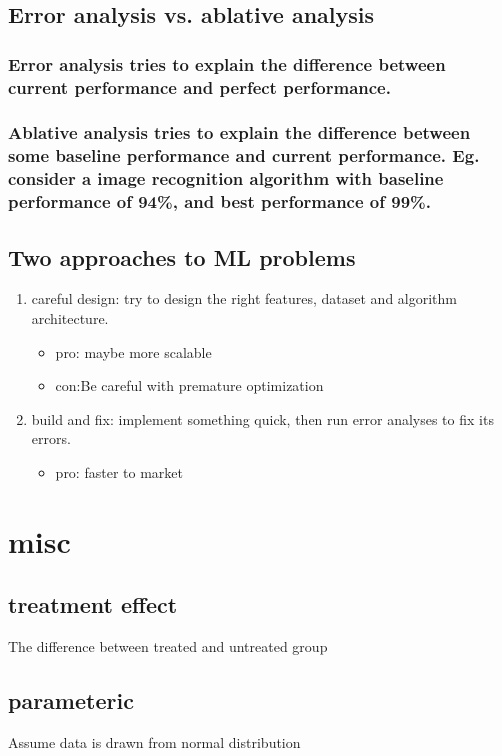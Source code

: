 \documentclass[11pt]{article}
\begin{document}
\subsection{Error analysis vs. ablative analysis}
\label{sec:org1a3acb7}
\subsubsection{Error analysis tries to explain the difference between current performance and perfect performance.}
\label{sec:orgcf1a646}
\subsubsection{Ablative analysis tries to explain the difference between some baseline performance and current performance. Eg. consider a image recognition algorithm with baseline performance of 94\%, and best performance of 99\%.}
\label{sec:org809df1a}
\subsection{Two approaches to ML problems}
\label{sec:orgd550598}
\begin{enumerate}
\item careful design: try to design the right features, dataset and algorithm architecture. 
\begin{itemize}
\item pro: maybe more scalable
\item con:Be careful with premature optimization
\end{itemize}
\item build and fix: implement something quick, then run error analyses to fix its errors. 
\begin{itemize}
\item pro: faster to market
\end{itemize}
\end{enumerate}
\section{misc}
\label{sec:orga18b382}
\subsection{treatment effect}
\label{sec:org8f81b4c}
The difference between treated and untreated group
\subsection{parameteric}
\label{sec:org9d6e616}
Assume data is drawn from normal distribution
\end{document}
